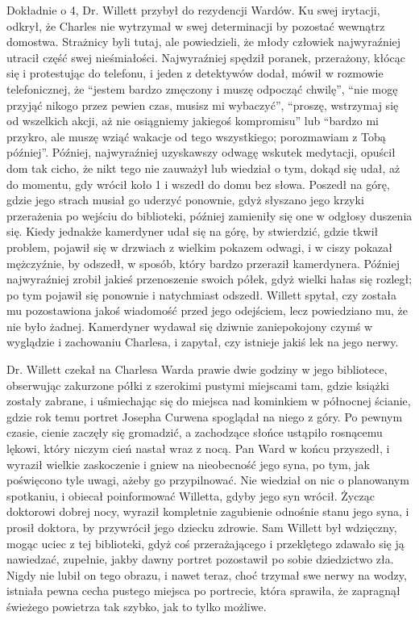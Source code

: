 Dokładnie o 4, Dr. Willett przybył do rezydencji Wardów. Ku swej irytacji, odkrył, że Charles nie wytrzymał w swej determinacji by pozostać wewnątrz domostwa. Strażnicy byli tutaj, ale powiedzieli, że młody człowiek najwyraźniej utracił część swej nieśmiałości. Najwyraźniej spędził poranek, przerażony, kłócąc się i protestując do telefonu, i jeden z detektywów dodał, mówił w rozmowie telefonicznej, że ``jestem bardzo zmęczony i muszę odpocząć chwilę'', ``nie mogę przyjąć nikogo przez pewien czas, musisz mi wybaczyć'', ``proszę, wstrzymaj się od wszelkich akcji, aż nie osiągniemy jakiegoś kompromisu'' lub ``bardzo mi przykro, ale muszę wziąć wakacje od tego wszystkiego; porozmawiam z Tobą później''. Później, najwyraźniej uzyskawszy odwagę wskutek medytacji, opuścił dom tak cicho, że nikt tego nie zauważył lub wiedział o tym, dokąd się udał, aż do momentu, gdy wrócił koło 1 i wszedł do domu bez słowa. Poszedł na górę, gdzie jego strach musiał go uderzyć ponownie, gdyż słyszano jego krzyki przerażenia po wejściu do biblioteki, później zamieniły się one w odgłosy duszenia się. Kiedy jednakże kamerdyner udał się na górę, by stwierdzić, gdzie tkwił problem, pojawił się w drzwiach z wielkim pokazem odwagi, i w ciszy pokazał mężczyźnie, by odszedł, w sposób, który bardzo przeraził kamerdynera. Później najwyraźniej zrobił jakieś przenoszenie swoich półek, gdyż wielki hałas się rozległ; po tym pojawił się ponownie i natychmiast odszedł. Willett spytał, czy została mu pozostawiona jakoś wiadomość przed jego odejściem, lecz powiedziano mu, że nie było żadnej. Kamerdyner wydawał się dziwnie zaniepokojony czymś w wyglądzie i zachowaniu Charlesa, i zapytał, czy istnieje jakiś lek na jego nerwy.

Dr. Willett czekał na Charlesa Warda prawie dwie godziny w jego bibliotece, obserwując zakurzone półki z szerokimi pustymi miejscami tam, gdzie książki zostały zabrane, i uśmiechając się do miejsca nad kominkiem w północnej ścianie, gdzie rok temu portret Josepha Curwena spoglądał na niego z góry. Po pewnym czasie, cienie zaczęły się gromadzić, a zachodzące słońce ustąpiło rosnącemu lękowi, który niczym cień nastał wraz z nocą. Pan Ward w końcu przyszedł, i wyraził wielkie zaskoczenie i gniew na nieobecność jego syna, po tym, jak poświęcono tyle uwagi, ażeby go przypilnować. Nie wiedział on nic o planowanym spotkaniu, i obiecał poinformować Willetta, gdyby jego syn wrócił. Życząc doktorowi dobrej nocy, wyraził kompletnie zagubienie odnośnie stanu jego syna, i prosił doktora, by przywrócił jego dziecku zdrowie. Sam Willett był wdzięczny, mogąc uciec z tej biblioteki, gdyż coś przerażającego i przeklętego zdawało się ją nawiedzać, zupełnie, jakby dawny portret pozostawił po sobie dziedzictwo zła. Nigdy nie lubił on tego obrazu, i nawet teraz, choć trzymał swe nerwy na wodzy, istniała pewna cecha pustego miejsca po portrecie, która sprawiła, że zapragnął świeżego powietrza tak szybko, jak to tylko możliwe. 

